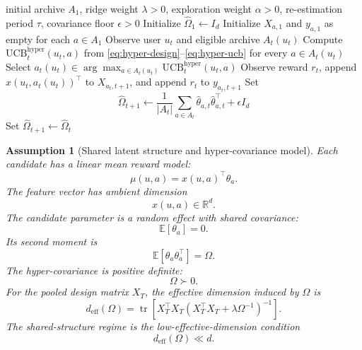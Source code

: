 \documentclass{article} %
\newtheorem{assumption}{Assumption}
\begin{document}
\begin{algorithm}[t]
\caption{Hyper-Ridge PersonalEvo routing}
\label{alg:hyper-ridge-summary}
\begin{algorithmic}[1]
\Require initial archive \(A_1\), ridge weight \(\lambda>0\), exploration weight \(\alpha>0\), re-estimation period \(\tau\), covariance floor \(\epsilon>0\)
\State Initialize \(\widehat{\Omega}_1 \gets I_d\)
\State Initialize \(X_{a,1}\) and \(y_{a,1}\) as empty for each \(a\in A_1\)
    \State Observe user \(u_t\) and eligible archive \(A_t(u_t)\)
    \State Compute \(\mathrm{UCB}_{t}^{\mathrm{hyper}}(u_t,a)\) from \eqref{eq:hyper-design}--\eqref{eq:hyper-ucb} for every \(a\in A_t(u_t)\)
    \State Select \(a_t(u_t)\in \arg\max_{a\in A_t(u_t)}\mathrm{UCB}_{t}^{\mathrm{hyper}}(u_t,a)\)
    \State Observe reward \(r_t\), append \(x(u_t,a_t(u_t))^\top\) to \(X_{a_t,t+1}\), and append \(r_t\) to \(y_{a_t,t+1}\)
        \State Set
        \[
        \widehat{\Omega}_{t+1}
        \gets
        \frac{1}{|A_t|}
        \sum_{a\in A_t}
        \widehat{\theta}_{a,t}\widehat{\theta}_{a,t}^{\top}
        +
        \epsilon I_d
        \]
    \Else
        \State Set \(\widehat{\Omega}_{t+1}\gets \widehat{\Omega}_t\)
    \EndIf
\EndFor
\end{algorithmic}
\end{algorithm}

\begin{assumption}[Shared latent structure and hyper-covariance model]
\label{assump:shared-structure}
Each candidate has a linear mean reward model:
\begin{equation}
\label{eq:hyper-linear-model}
\mu(u,a)
=
x(u,a)^{\top}\theta_a.
\end{equation}
The feature vector has ambient dimension
\begin{equation}
\label{eq:hyper-feature-dim}
x(u,a)\in\mathbb{R}^{d}.
\end{equation}
The candidate parameter is a random effect with shared covariance:
\begin{equation}
\label{eq:hyper-random-effect}
\mathbb{E}[\theta_a]
=
0.
\end{equation}
Its second moment is
\begin{equation}
\label{eq:hyper-covariance}
\mathbb{E}[\theta_a\theta_a^{\top}]
=
\Omega.
\end{equation}
The hyper-covariance is positive definite:
\begin{equation}
\label{eq:hyper-pd}
\Omega\succ 0.
\end{equation}
For the pooled design matrix \(X_T\), the effective dimension induced by \(\Omega\) is
\begin{equation}
\label{eq:hyper-deff}
d_{\mathrm{eff}}(\Omega)
=
\operatorname{tr}
\!\left[
X_T^{\top}X_T
\left(
X_T^{\top}X_T+\lambda\Omega^{-1}
\right)^{-1}
\right].
\end{equation}
The shared-structure regime is the low-effective-dimension condition
\begin{equation}
\label{eq:hyper-low-deff}
d_{\mathrm{eff}}(\Omega)
\ll
d.
\end{equation}
\end{assumption}
\end{document}
